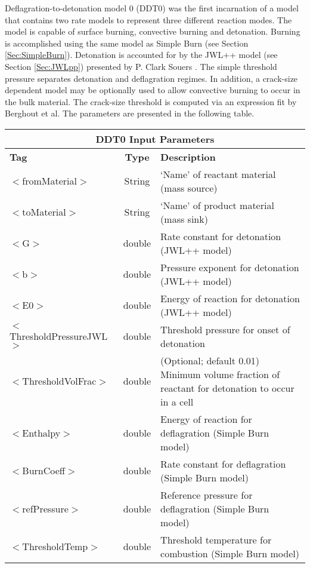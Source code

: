 Deflagration-to-detonation model 0 (DDT0) was the first incarnation of a model 
that contains two rate models to represent three different reaction modes. The 
model is capable of surface burning, convective burning and detonation. Burning
is accomplished using the same model as Simple Burn (see Section \ref{Sec:SimpleBurn}).  Detonation
is accounted for by the JWL++ model (see Section \ref{Sec:JWLpp}) presented by P. Clark Souers  \cite{ref:JWL}.  
The simple threshold pressure separates detonation and deflagration regimes.  In addition,
a crack-size dependent model may be optionally used to allow convective burning to 
occur in the bulk material.  The crack-size threshold is computed via an expression fit by
Berghout et al. \cite{ref:Berghout2002}  The parameters are presented in the following table.

\begin{center}
\begin{tabular}{| l | c | p{7cm} |}
\hline
  \multicolumn{3}{|c|}{\textbf{DDT0 Input Parameters}} \\
\hline
\hline
  \textbf{Tag} & \textbf{Type} & \textbf{Description}\\
\hline
  $<$fromMaterial$>$ & String & `Name' of reactant material (mass source)\\
\hline
  $<$toMaterial$>$ & String & `Name' of product material (mass sink)\\
\hline
  $<$G$>$ & double & Rate constant for detonation (JWL++ model) \\
\hline
  $<$b$>$ & double & Pressure exponent for detonation (JWL++ model) \\
\hline
  $<$E0$>$ & double & Energy of reaction for detonation (JWL++ model) \\
\hline
  $<$ThresholdPressureJWL$>$ & double & Threshold pressure for onset of detonation \\
\hline
  $<$ThresholdVolFrac$>$ & double & (Optional; default 0.01) Minimum volume fraction of reactant for detonation to occur in a cell \\
\hline
  $<$Enthalpy$>$ & double & Energy of reaction for deflagration (Simple Burn model) \\
\hline
  $<$BurnCoeff$>$ & double & Rate constant for deflagration (Simple Burn model) \\
\hline
  $<$refPressure$>$ & double & Reference pressure for deflagration (Simple Burn model) \\
\hline
  $<$ThresholdTemp$>$ & double & Threshold temperature for combustion (Simple Burn model) \\

\end{tabular}
\end{center}
